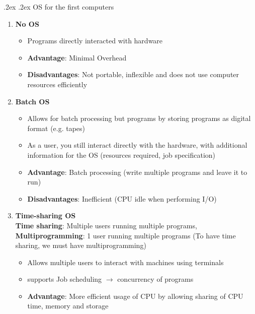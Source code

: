 \documentclass[13pt,landscape,a4paper]{article}
\makeatletter
\renewcommand{\subsubsection}{\@startsection{subsubsection}{1}{0mm}%
    {.2ex}%
    {.2ex}%
    {\rmfamily\bfseries}}
\makeatother
\begin{document}
\begin{multicols*}{3}
        \subsubsection{OS for the first computers}
        \begin{enumerate}
            \item \textbf{No OS}
            \begin{itemize}
                \item Programs directly interacted with hardware
                \item \textbf{Advantage}: Minimal Overhead
                \item \textbf{Disadvantages}: Not portable, inflexible and does not use computer resources efficiently
            \end{itemize}
            \item \textbf{Batch OS}
            \begin{itemize}
                \item Allows for batch processing but programs by storing programs as digital format (e.g. tapes)
                \item As a user, you still interact directly with the hardware, with additional information for the OS (resources required, job specification)
                \item \textbf{Advantage}: Batch processing (write multiple programs and leave it to run)
                \item \textbf{Disadvantages}: Inefficient (CPU idle when performing I/O)
            \end{itemize}
            \item \textbf{Time-sharing OS}\\
            \textbf{Time sharing}: Multiple users running multiple programs, \textbf{Multiprogramming}: 1 user running multiple programs (To have time sharing, we must have multiprogramming)
            \begin{itemize}
                \item Allows multiple users to interact with machines using terminals
                \item supports Job scheduling $\rightarrow$ concurrency of programs
                \item \textbf{Advantage}: More efficient usage of CPU by allowing sharing of CPU time, memory and storage
            \end{itemize}
        \end{enumerate}

\end{multicols*}
\end{document}
